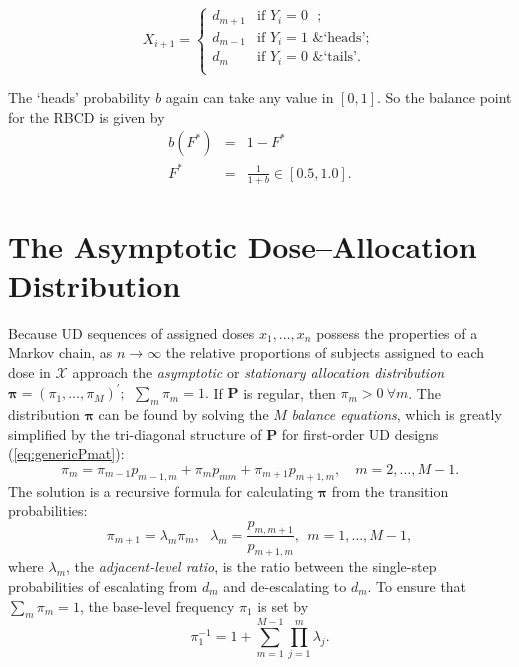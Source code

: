\begin{equation}\label{eq:DF_RBCD}
X_{i+1}=
\begin{cases}
d_{m+1} &\textrm{if $Y_i=0$ };\\
d_{m-1} &\textrm{if $Y_i=1$ \& `heads'};\\
d_m &\textrm{if $Y_i=0$ \& `tails'}.\\
\end{cases}
\end{equation}

The `heads' probability $b$ again can take any value in $[0,1]$. So the balance point for the RBCD is given by
\begin{equation}\label{eq:rbcdx*}
\begin{array}{rcl}
    b\left(F^*\right) &=& 1-F^*\\
    F^* &=& \frac{1}{1+b}\in[0.5,1.0].
\end{array}
\end{equation}
%

\section{The Asymptotic Dose--Allocation Distribution}\label{sec:pi}

Because UD sequences of assigned doses $x_1,\ldots,x_n$ possess the properties of a Markov chain, as $n\to\infty$ the relative proportions of subjects assigned to each dose in $\mathcal{X}$ approach the \emph{asymptotic} or \emph{stationary allocation distribution} $\boldsymbol{\pi}=\left(\pi_1,\ldots,\pi_M\right)^{\prime};\ \ \sum_m \pi_m=1.$  If $\mathbf{P}$ is regular, then $\pi_m>0\ \forall m$. The distribution $\boldsymbol{\pi}$ can be found by solving the $M$ \emph{balance equations}, which is greatly simplified by the tri-diagonal structure of $\mathbf{P}$ for first-order UD designs (\ref{eq:genericPmat}):
\begin{equation}\label{eq:balance}
\pi_m=\pi_{m-1}p_{m-1,m}+\pi_mp_{mm}+\pi_{m+1}p_{m+1,m},\quad m=2,\ldots,M-1.
\end{equation}
The solution is a recursive formula for calculating $\boldsymbol{\pi}$ from the transition probabilities:
\begin{equation}\label{eq:balance_solution}
\pi_{m+1}=\lambda_m \pi_m,\ \ \ \lambda_m=\frac{p_{m,m+1}}{p_{m+1,m}},\ \  m=1,\ldots,M-1,
\end{equation}
where $\lambda_m$,  the \emph{adjacent-level ratio}, is the ratio between the single-step probabilities of escalating from $d_m$ and de-escalating to $d_{m}$. To ensure that $\sum_m \pi_m=1$, the base-level frequency $\pi_1$ is set by
\begin{equation*}
\pi_1^{-1}=1+\displaystyle\sum_{m=1}^{M-1}\displaystyle\prod_{j=1}^m\lambda_j.
\end{equation*}

